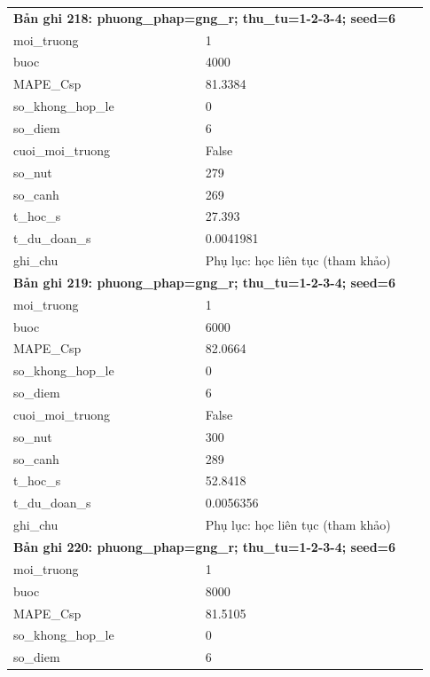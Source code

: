 \begin{longtable}{p{0.43\linewidth}p{0.50\linewidth}}
\midrule
\multicolumn{2}{p{0.95\linewidth}}{\textbf{Bản ghi 218: phuong\_phap=gng\_r; thu\_tu=1-2-3-4; seed=6}} \\
moi\_\allowbreak truong & 1 \\
buoc & 4000 \\
MAPE\_\allowbreak Csp & 81.3384 \\
so\_\allowbreak khong\_\allowbreak hop\_\allowbreak le & 0 \\
so\_\allowbreak diem & 6 \\
cuoi\_\allowbreak moi\_\allowbreak truong & False \\
so\_\allowbreak nut & 279 \\
so\_\allowbreak canh & 269 \\
t\_\allowbreak hoc\_\allowbreak s & 27.393 \\
t\_\allowbreak du\_\allowbreak doan\_\allowbreak s & 0.0041981 \\
ghi\_\allowbreak chu & Phụ lục: học liên tục (tham khảo) \\
\midrule
\multicolumn{2}{p{0.95\linewidth}}{\textbf{Bản ghi 219: phuong\_phap=gng\_r; thu\_tu=1-2-3-4; seed=6}} \\
moi\_\allowbreak truong & 1 \\
buoc & 6000 \\
MAPE\_\allowbreak Csp & 82.0664 \\
so\_\allowbreak khong\_\allowbreak hop\_\allowbreak le & 0 \\
so\_\allowbreak diem & 6 \\
cuoi\_\allowbreak moi\_\allowbreak truong & False \\
so\_\allowbreak nut & 300 \\
so\_\allowbreak canh & 289 \\
t\_\allowbreak hoc\_\allowbreak s & 52.8418 \\
t\_\allowbreak du\_\allowbreak doan\_\allowbreak s & 0.0056356 \\
ghi\_\allowbreak chu & Phụ lục: học liên tục (tham khảo) \\
\midrule
\multicolumn{2}{p{0.95\linewidth}}{\textbf{Bản ghi 220: phuong\_phap=gng\_r; thu\_tu=1-2-3-4; seed=6}} \\
moi\_\allowbreak truong & 1 \\
buoc & 8000 \\
MAPE\_\allowbreak Csp & 81.5105 \\
so\_\allowbreak khong\_\allowbreak hop\_\allowbreak le & 0 \\
so\_\allowbreak diem & 6 \\

\end{longtable}
